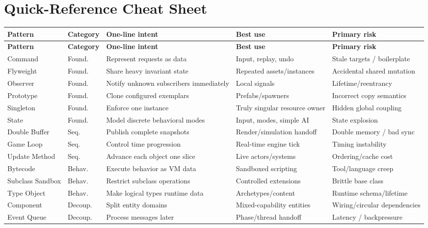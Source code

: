 \documentclass[11pt]{article}
\begin{document}
\section{Quick-Reference Cheat Sheet}\label{sec:cheat-sheet}
\small
\begin{longtable}{P{2.15cm}P{1.65cm}P{3.50cm}P{3.25cm}P{3.55cm}}
\toprule
\textbf{Pattern} & \textbf{Category} & \textbf{One-line intent} & \textbf{Best use} & \textbf{Primary risk}\\
\midrule
\endfirsthead
\toprule
\textbf{Pattern} & \textbf{Category} & \textbf{One-line intent} & \textbf{Best use} & \textbf{Primary risk}\\
\midrule
\endhead
Command & Found. & Represent requests as data & Input, replay, undo & Stale targets / boilerplate\\
Flyweight & Found. & Share heavy invariant state & Repeated assets/instances & Accidental shared mutation\\
Observer & Found. & Notify unknown subscribers immediately & Local signals & Lifetime/reentrancy\\
Prototype & Found. & Clone configured exemplars & Prefabs/spawners & Incorrect copy semantics\\
Singleton & Found. & Enforce one instance & Truly singular resource owner & Hidden global coupling\\
State & Found. & Model discrete behavioral modes & Input, modes, simple AI & State explosion\\
Double Buffer & Seq. & Publish complete snapshots & Render/simulation handoff & Double memory / bad sync\\
Game Loop & Seq. & Control time progression & Real-time engine tick & Timing instability\\
Update Method & Seq. & Advance each object one slice & Live actors/systems & Ordering/cache cost\\
Bytecode & Behav. & Execute behavior as VM data & Sandboxed scripting & Tool/language creep\\
Subclass Sandbox & Behav. & Restrict subclass operations & Controlled extensions & Brittle base class\\
Type Object & Behav. & Make logical types runtime data & Archetypes/content & Runtime schema/lifetime\\
Component & Decoup. & Split entity domains & Mixed-capability entities & Wiring/circular dependencies\\
Event Queue & Decoup. & Process messages later & Phase/thread handoff & Latency / backpressure\\

\end{longtable}
\end{document}
